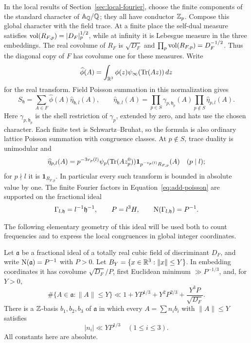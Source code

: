In the local results of Section~\ref{sec:local-fourier}, choose the finite
components of the standard character of \(\mathbb A_\mathbb Q/\mathbb Q\); they all have
conductor \(\mathbb Z_p\).  Compose this global character with the field trace.
At a finite place the self-dual measure satisfies
\(\operatorname{vol}(R_{F,p})=|D_F|_p^{1/2}\), while at infinity it is Lebesgue measure
in the three embeddings.  The real covolume of \(R_F\) is \(\sqrt{D_F}\)
and \(\prod_p\operatorname{vol}(R_{F,p})=D_F^{-1/2}\).  Thus the diagonal copy of \(F\)
has covolume one for these measures.  Write
\[
 \widehat\phi(A)=\int_{\mathbb R^3}\phi(z)\psi_\infty(\operatorname{Tr}(Az))\,dz
\]
for the real transform.  Field Poisson summation in this
normalization \cite[Section~4.2, Lemma~4.2.4]{Tate1967} gives
\begin{equation}
 S_{\mathfrak h}
   =\sum_{A\in F}\widehat\phi(A)
             \widehat\eta_{\mathfrak h,l}(A),\qquad
 \widehat\eta_{\mathfrak h,l}(A)
   =\prod_{p\in S}\gamma_{p,\mathfrak h_p}(A)
       \prod_{p\notin S}\widehat\eta_{p,l}(A).
 \label{eq:add-poisson}
\end{equation}
Here \(\gamma_{p,\mathfrak h_p}\) is the shell restriction of \(\gamma_p\),
extended by zero, and hats use the chosen character.  Each finite test is
Schwartz--Bruhat, so the formula is also ordinary lattice Poisson summation
with congruence classes.  At \(p\notin S\), trace duality is unimodular and
\[
 \widehat\eta_{p,l}(A)
   =p^{-3v_p(l)}
       \psi_p(\operatorname{Tr}(Az_p^0))
       \mathbf 1_{p^{-v_p(l)}R_{F,p}}(A)
       \quad (p\mid l);
\]
for \(p\nmid l\) it is \(\mathbf 1_{R_{F,p}}\).
In particular every such transform is bounded in absolute value by one.
The finite Fourier factors in Equation~\eqref{eq:add-poisson} are supported
on the fractional ideal
\begin{equation}
 \Gamma_{l,\mathfrak h}=l^{-1}\mathfrak h^{-1},\qquad P=l^3H,
 \qquad
 \operatorname{N}(\Gamma_{l,\mathfrak h})=P^{-1}.
 \label{eq:add-frequency-lattice}
\end{equation}

The following elementary geometry of this ideal will be used both to count
frequencies and to express the local congruences in global integer
coordinates.

\begin{lemma}
\label{lem:add-ideal-lattice}
Let \(\mathfrak a\) be a fractional ideal of a totally real cubic field of
discriminant \(D_F\), and write \(\operatorname{N}(\mathfrak a)=P^{-1}\) with \(P>0\).
Let \(B_Y=\{x\in\mathbb R^3:\|x\|\le Y\}\).
In embedding coordinates it has covolume \(\sqrt{D_F}/P\), first Euclidean
minimum \(\gg P^{-1/3}\), and, for \(Y>0\),
\begin{equation}
 \#\{A\in\mathfrak a:\|A\|\le Y\}
  \ll 1+YP^{1/3}+Y^2P^{2/3}+\frac{Y^3P}{\sqrt{D_F}} .
 \label{eq:add-lattice-count}
\end{equation}
There is a \(\mathbb Z\)-basis \(b_1,b_2,b_3\) of \(\mathfrak a\) in which every
\(A=\sum n_i b_i\) with \(\|A\|\le Y\) satisfies
\[
 |n_i|\ll YP^{1/3}\quad(1\le i\le3).
\]
All constants here are absolute.
\end{lemma}

